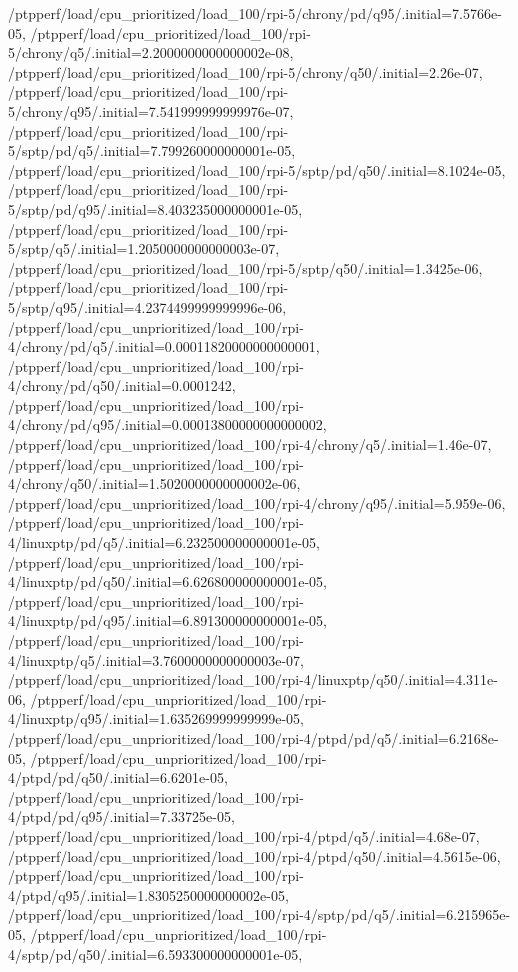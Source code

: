 {    /ptpperf/load/cpu_prioritized/load_100/rpi-5/chrony/pd/q95/.initial=7.5766e-05,
    /ptpperf/load/cpu_prioritized/load_100/rpi-5/chrony/q5/.initial=2.2000000000000002e-08,
    /ptpperf/load/cpu_prioritized/load_100/rpi-5/chrony/q50/.initial=2.26e-07,
    /ptpperf/load/cpu_prioritized/load_100/rpi-5/chrony/q95/.initial=7.541999999999976e-07,
    /ptpperf/load/cpu_prioritized/load_100/rpi-5/sptp/pd/q5/.initial=7.799260000000001e-05,
    /ptpperf/load/cpu_prioritized/load_100/rpi-5/sptp/pd/q50/.initial=8.1024e-05,
    /ptpperf/load/cpu_prioritized/load_100/rpi-5/sptp/pd/q95/.initial=8.403235000000001e-05,
    /ptpperf/load/cpu_prioritized/load_100/rpi-5/sptp/q5/.initial=1.2050000000000003e-07,
    /ptpperf/load/cpu_prioritized/load_100/rpi-5/sptp/q50/.initial=1.3425e-06,
    /ptpperf/load/cpu_prioritized/load_100/rpi-5/sptp/q95/.initial=4.2374499999999996e-06,
    /ptpperf/load/cpu_unprioritized/load_100/rpi-4/chrony/pd/q5/.initial=0.00011820000000000001,
    /ptpperf/load/cpu_unprioritized/load_100/rpi-4/chrony/pd/q50/.initial=0.0001242,
    /ptpperf/load/cpu_unprioritized/load_100/rpi-4/chrony/pd/q95/.initial=0.00013800000000000002,
    /ptpperf/load/cpu_unprioritized/load_100/rpi-4/chrony/q5/.initial=1.46e-07,
    /ptpperf/load/cpu_unprioritized/load_100/rpi-4/chrony/q50/.initial=1.5020000000000002e-06,
    /ptpperf/load/cpu_unprioritized/load_100/rpi-4/chrony/q95/.initial=5.959e-06,
    /ptpperf/load/cpu_unprioritized/load_100/rpi-4/linuxptp/pd/q5/.initial=6.232500000000001e-05,
    /ptpperf/load/cpu_unprioritized/load_100/rpi-4/linuxptp/pd/q50/.initial=6.626800000000001e-05,
    /ptpperf/load/cpu_unprioritized/load_100/rpi-4/linuxptp/pd/q95/.initial=6.891300000000001e-05,
    /ptpperf/load/cpu_unprioritized/load_100/rpi-4/linuxptp/q5/.initial=3.7600000000000003e-07,
    /ptpperf/load/cpu_unprioritized/load_100/rpi-4/linuxptp/q50/.initial=4.311e-06,
    /ptpperf/load/cpu_unprioritized/load_100/rpi-4/linuxptp/q95/.initial=1.635269999999999e-05,
    /ptpperf/load/cpu_unprioritized/load_100/rpi-4/ptpd/pd/q5/.initial=6.2168e-05,
    /ptpperf/load/cpu_unprioritized/load_100/rpi-4/ptpd/pd/q50/.initial=6.6201e-05,
    /ptpperf/load/cpu_unprioritized/load_100/rpi-4/ptpd/pd/q95/.initial=7.33725e-05,
    /ptpperf/load/cpu_unprioritized/load_100/rpi-4/ptpd/q5/.initial=4.68e-07,
    /ptpperf/load/cpu_unprioritized/load_100/rpi-4/ptpd/q50/.initial=4.5615e-06,
    /ptpperf/load/cpu_unprioritized/load_100/rpi-4/ptpd/q95/.initial=1.8305250000000002e-05,
    /ptpperf/load/cpu_unprioritized/load_100/rpi-4/sptp/pd/q5/.initial=6.215965e-05,
    /ptpperf/load/cpu_unprioritized/load_100/rpi-4/sptp/pd/q50/.initial=6.593300000000001e-05,
}
